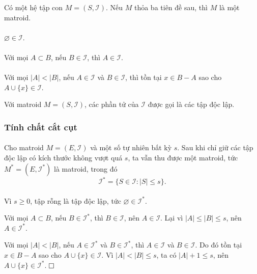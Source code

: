 \documentclass[11pt]{article}
\newcommand{\proofbox}{\ensuremath{\vcenter{\hrule height 0.45pt
  \hbox{\vrule width 0.45pt height 6pt\kern 6pt\vrule width 0.45pt}
  \hrule height 0.45pt}}}
\begin{document}
Có một hệ tập con \(M=(S,\mathcal{I})\). Nếu \(M\) thỏa ba tiên đề sau, thì
\(M\) là một matroid.

\paragraph{}
\(\varnothing\in\mathcal{I}\).

\paragraph{}
Với mọi \(A\subset B\), nếu \(B\in\mathcal{I}\), thì
\(A\in\mathcal{I}\).

\paragraph{}
Với mọi \(|A|<|B|\), nếu \(A\in\mathcal{I}\) và
\(B\in\mathcal{I}\), thì tồn tại \(x\in B-A\) sao cho
\(A\cup\{x\}\in\mathcal{I}\).

Với matroid \(M=(S,\mathcal{I})\), các phần tử của \(\mathcal{I}\) được gọi là
các tập độc lập.

\subsubsection{Tính chất cắt cụt}

\paragraph{}
Cho matroid \(M=(E,\mathcal{I})\) và một số tự nhiên bất kỳ \(s\). Sau khi chỉ
giữ các tập độc lập có kích thước không vượt quá \(s\), ta vẫn thu được một
matroid, tức \(M^*=(E,\mathcal{I}^*)\) là matroid, trong đó
\[
\mathcal{I}^*=\{S\in\mathcal{I}: |S|\le s\}.
\]

\paragraph{}
Vì \(s\ge 0\), tập rỗng là tập độc lập, tức
\(\varnothing\in\mathcal{I}^*\).

Với mọi \(A\subset B\), nếu \(B\in\mathcal{I}^*\), thì
\(B\in\mathcal{I}\), nên \(A\in\mathcal{I}\). Lại vì
\(|A|\le |B|\le s\), nên \(A\in\mathcal{I}^*\).

Với mọi \(|A|<|B|\), nếu \(A\in\mathcal{I}^*\) và
\(B\in\mathcal{I}^*\), thì \(A\in\mathcal{I}\) và
\(B\in\mathcal{I}\). Do đó tồn tại \(x\in B-A\) sao cho
\(A\cup\{x\}\in\mathcal{I}\). Vì \(|A|<|B|\le s\), ta có
\(|A|+1\le s\), nên \(A\cup\{x\}\in\mathcal{I}^*\). \proofbox
\end{document}
